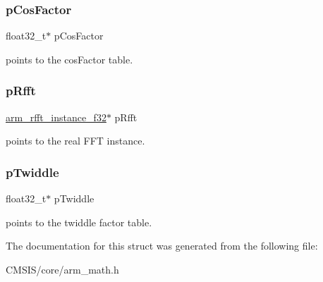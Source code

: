 \subsubsection{\texorpdfstring{p\+Cos\+Factor}{pCosFactor}}
{\footnotesize\ttfamily float32\+\_\+t$\ast$ p\+Cos\+Factor}

points to the cos\+Factor table. \mbox{\label{structarm__dct4__instance__f32_ad4cd7c85eea3f7c5fff4630bbd979e6a}} 
\subsubsection{\texorpdfstring{p\+Rfft}{pRfft}}
{\footnotesize\ttfamily \hyperlink{structarm__rfft__instance__f32}{arm\+\_\+rfft\+\_\+instance\+\_\+f32}$\ast$ p\+Rfft}

points to the real F\+FT instance. \mbox{\label{structarm__dct4__instance__f32_aca581481fccdff0f557f54a3ef20d967}} 
\subsubsection{\texorpdfstring{p\+Twiddle}{pTwiddle}}
{\footnotesize\ttfamily float32\+\_\+t$\ast$ p\+Twiddle}

points to the twiddle factor table. 

The documentation for this struct was generated from the following file\+:\begin{DoxyCompactItemize}
\item 
C\+M\+S\+I\+S/core/arm\+\_\+math.\+h\end{DoxyCompactItemize}
